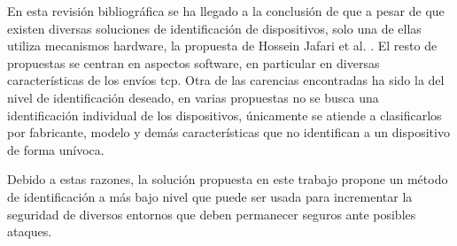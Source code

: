 En esta revisión bibliográfica se ha llegado a la conclusión de que a pesar de que existen diversas soluciones de identificación de dispositivos, solo una de ellas utiliza mecanismos hardware, la propuesta de Hossein Jafari et al. \cite{jafari2018iot}. El resto de propuestas se centran en aspectos software, en particular en diversas características de los envíos \acrshort{tcp}. Otra de las carencias encontradas ha sido la del nivel de identificación deseado, en varias propuestas no se busca una identificación individual de los dispositivos, únicamente se atiende a clasificarlos por fabricante, modelo y demás características que no identifican a un dispositivo de forma unívoca.

Debido a estas razones, la solución propuesta en este trabajo propone un método de identificación a más bajo nivel que puede ser usada para incrementar la seguridad de diversos entornos que deben permanecer seguros ante posibles ataques.

